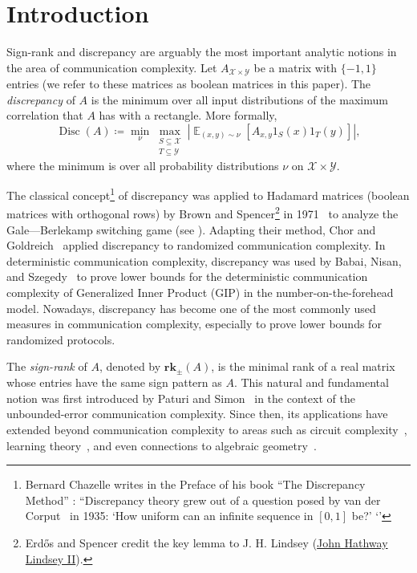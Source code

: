 \documentclass{toc}
\DeclareMathOperator{\Ex}{{\mathbb E}}
\DeclareMathOperator{\Disc}{Disc}
\newcommand{\defeq}{\coloneqq}
\newcommand{\cX}{\mathcal{X}}
\newcommand{\cY}{\mathcal{Y}}
\newcommand{\srk}{\mathbf{rk}_{\pm}}   %
\begin{document}
\section{Introduction}

Sign-rank and discrepancy are arguably the most important analytic notions in the area of communication complexity. Let $A_{\cX \times \cY}$ be a matrix with $\{-1,1\}$ entries (we refer to these matrices as boolean matrices in this paper).
The \emph{discrepancy} of $A$ is the minimum over all input distributions 
of the maximum correlation that $A$ has with a rectangle.  More formally,
\begin{equation} 
\label{eq:disc}
\Disc(A) \defeq \min_{\nu} \max_{\substack{S \subseteq  \cX \\ T \subseteq \cY}}\left| \Ex_{(x,y) \sim \nu} [A_{x,y} 1_S(x) 1_T(y)]\right|,
\end{equation}
where the minimum is over all probability distributions $\nu$ on 
$\cX \times \cY$.
%
%
%
%
%
%
%
%
%
%
%
%
%
%
%
%
%
%
%
%
%
%
%
%
%
%
%
%
%

The classical concept\footnote{Bernard Chazelle writes in the Preface of his book ``The Discrepancy Method'' \cite{chazelle}:
``Discrepancy theory grew out of a question posed by van der Corput~\cite{corput} in 1935: `How uniform can an infinite sequence in $[0,1]$ be?' ‘'} of discrepancy was applied to Hadamard matrices (boolean matrices with orthogonal rows) by Brown and Spencer\footnote{Erd\H{o}s and Spencer credit the key lemma to J. H. Lindsey (\href{https://www.mathgenealogy.org/id.php?id=106133}{John Hathway Lindsey II}).} in 1971~\cite{switching-game} to analyze the Gale—Berlekamp switching game (see \cite[Ch. 15]{erdos-spencer}). Adapting their method, Chor and Goldreich~\cite{chor1988unbiased} applied discrepancy to randomized communication complexity. In deterministic communication complexity,  discrepancy was used by Babai, Nisan, and Szegedy~\cite{babai1992multiparty} to prove lower bounds for the deterministic communication complexity of Generalized Inner Product (GIP) in the number-on-the-forehead model. Nowadays, discrepancy has become one of the most commonly used measures in communication complexity, especially to prove lower bounds for randomized protocols.




The \emph{sign-rank} of $A$, denoted by $\srk(A)$, is the minimal rank 
of a real matrix
whose entries have the same sign pattern as $A$. This natural and fundamental
notion was  first introduced  by Paturi and 
Simon~\cite{paturi1986probabilistic} in the context of the unbounded-error communication complexity.  Since then,  its applications have extended beyond communication complexity   to areas  such as    circuit complexity~\cite{MR2592035,MR3577098}, learning theory~\cite{MR2359826,MR2497381,MR2059097}, and even connections to algebraic geometry~\cite{MR0226281}.
\end{document}
